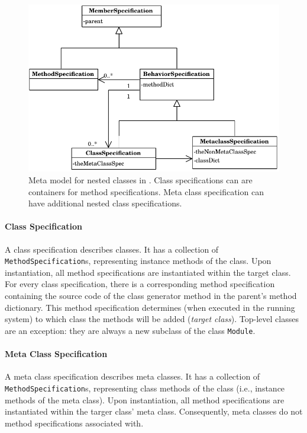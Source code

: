 \begin{figure}[!hbp]
	\centering
	\includegraphics[scale=0.75]{metamodel.pdf}
	\caption[Meta model in \msname]{Meta model for nested classes in \msname. Class specifications can are containers for method specifications. Meta class specification can have additional nested class specifications.}
	\label{fig:impl_meta_model}
\end{figure}

\paragraph{Class Specification}
A class specification describes classes. It has a collection of \texttt{MethodSpecification}s, representing instance methods of the class. Upon instantiation, all method specifications are instantiated within the target class. For every class specification, there is a corresponding method specification containing the source code of the class generator method in the parent's method dictionary. This method specification determines (when executed in the running system) to which class the methods will be added (\emph{target class}). Top-level classes are an exception: they are always a new subclass of the class \texttt{Module}.

\paragraph{Meta Class Specification}
A meta class specification describes meta classes. It has a collection of \texttt{MethodSpecification}s, representing class methods of the class (i.e., instance methods of the meta class). Upon instantiation, all method specifications are instantiated within the targer class' meta class. Consequently, meta classes do not method specifications associated with.

